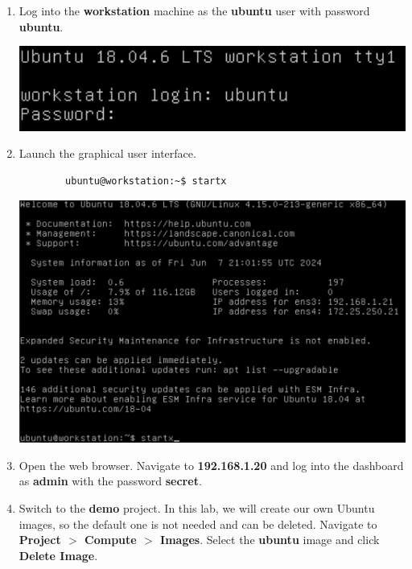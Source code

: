 \documentclass[letterpaper, 12pt]{article}
\begin{document}
\begin{enumerate}
    \item Log into the \textbf{workstation} machine as the \textbf{ubuntu} user with password \textbf{ubuntu}.

    \begin{center}
        \includegraphics[width=\linewidth]{images/part1/step1.png}
    \end{center}

    \item Launch the graphical user interface.
    \begin{lstlisting}
        ubuntu@workstation:~$ startx
    \end{lstlisting}

    \begin{center}
        \includegraphics[width=\linewidth]{images/part1/step2.png}
    \end{center}

    \item Open the web browser.
    Navigate to \textbf{192.168.1.20} and log into the dashboard as \textbf{admin} with the password \textbf{secret}.

    \item Switch to the \textbf{demo} project.
    In this lab, we will create our own Ubuntu images, so the default one is not needed and can be deleted.
    Navigate to \textbf{Project $>$ Compute $>$ Images}.
    Select the \textbf{ubuntu} image and click \textbf{Delete Image}.


\end{enumerate}
\end{document}
